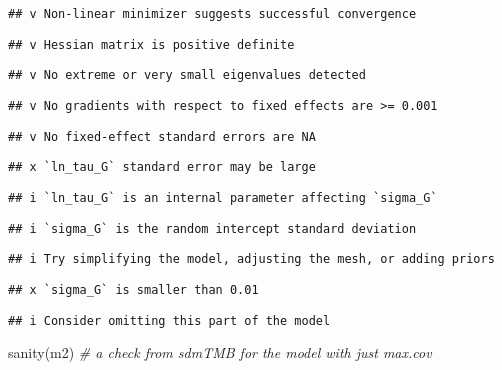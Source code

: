 \documentclass[
]{article}
\newenvironment{Shaded}{\begin{snugshade}}{\end{snugshade}}
\newcommand{\CommentTok}[1]{\textcolor[rgb]{0.56,0.35,0.01}{\textit{#1}}}
\newcommand{\FunctionTok}[1]{\textcolor[rgb]{0.00,0.00,0.00}{#1}}
\newcommand{\NormalTok}[1]{#1}
\begin{document}
\begin{verbatim}
## v Non-linear minimizer suggests successful convergence
\end{verbatim}

\begin{verbatim}
## v Hessian matrix is positive definite
\end{verbatim}

\begin{verbatim}
## v No extreme or very small eigenvalues detected
\end{verbatim}

\begin{verbatim}
## v No gradients with respect to fixed effects are >= 0.001
\end{verbatim}

\begin{verbatim}
## v No fixed-effect standard errors are NA
\end{verbatim}

\begin{verbatim}
## x `ln_tau_G` standard error may be large
\end{verbatim}

\begin{verbatim}
## i `ln_tau_G` is an internal parameter affecting `sigma_G`
\end{verbatim}

\begin{verbatim}
## i `sigma_G` is the random intercept standard deviation
\end{verbatim}

\begin{verbatim}
## i Try simplifying the model, adjusting the mesh, or adding priors
\end{verbatim}

\begin{verbatim}
## x `sigma_G` is smaller than 0.01
\end{verbatim}

\begin{verbatim}
## i Consider omitting this part of the model
\end{verbatim}

\begin{Shaded}
\begin{Highlighting}[]
\FunctionTok{sanity}\NormalTok{(m2) }\CommentTok{\# a check from sdmTMB for the model with just max.cov}
\end{Highlighting}
\end{Shaded}
\end{document}
